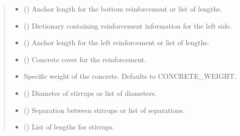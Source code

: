 \documentclass[a4paper,10pt,english]{sphinxmanual}
\begin{document}
\begin{fulllineitems}
\begin{quote}
\begin{description}
\begin{itemize}
\item {} 
\sphinxAtStartPar
{} (\sphinxstyleliteralemphasis{\sphinxupquote{ | }}) \textendash{} Anchor length for the bottom reinforcement or list of lengths.

\item {} 
\sphinxAtStartPar
{} () \textendash{} Dictionary containing reinforcement information for the left side.

\item {} 
\sphinxAtStartPar
{} (\sphinxstyleliteralemphasis{\sphinxupquote{ | }}) \textendash{} Anchor length for the left reinforcement or list of lengths.

\item {} 
\sphinxAtStartPar
{} () \textendash{} Concrete cover for the reinforcement.

\item {} 
\sphinxAtStartPar
{} \textendash{} Specific weight of the concrete. Defaults to CONCRETE\_WEIGHT.

\item {} 
\sphinxAtStartPar
{} (\sphinxstyleliteralemphasis{\sphinxupquote{ | }}) \textendash{} Diameter of stirrups or list of diameters.

\item {} 
\sphinxAtStartPar
{} (\sphinxstyleliteralemphasis{\sphinxupquote{ | }}) \textendash{} Separation between stirrups or list of separations.

\item {} 
\sphinxAtStartPar
{} () \textendash{} List of lengths for stirrups.


\end{itemize}
\end{description}
\end{quote}
\end{fulllineitems}
\end{document}
